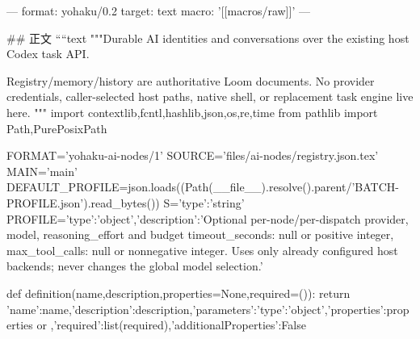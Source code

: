 ---
format: yohaku/0.2
target: text
macro: '[[macros/raw]]'
---

## 正文
````text
"""Durable AI identities and conversations over the existing host Codex task API.

Registry/memory/history are authoritative Loom documents. No provider credentials,
caller-selected host paths, native shell, or replacement task engine live here.
"""
import contextlib,fcntl,hashlib,json,os,re,time
from pathlib import Path,PurePosixPath

FORMAT='yohaku-ai-nodes/1'
SOURCE='files/ai-nodes/registry.json.tex'
MAIN='main'
DEFAULT_PROFILE=json.loads((Path(__file__).resolve().parent/'BATCH-PROFILE.json').read_bytes())
S={'type':'string'}
PROFILE={'type':'object','description':'Optional per-node/per-dispatch provider, model, reasoning_effort and budget {timeout_seconds: null or positive integer, max_tool_calls: null or nonnegative integer}. Uses only already configured host backends; never changes the global model selection.'}

def definition(name,description,properties=None,required=()):
 return {'name':name,'description':description,'parameters':{'type':'object','properties':properties or {},'required':list(required),'additionalProperties':False}}

